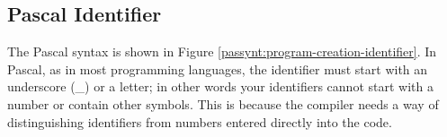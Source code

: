 \clearpage
\subsection{Pascal Identifier} %
\label{sub:pas_identifier}

The Pascal  syntax is shown in Figure \ref{passynt:program-creation-identifier}. In Pascal, as in most programming languages, the identifier must start with an underscore (\_) or a letter; in other words your identifiers cannot start with a number or contain other symbols. This is because the compiler needs a way of distinguishing identifiers from numbers entered directly into the code.




